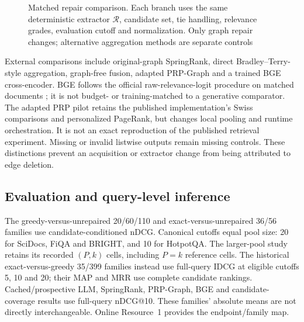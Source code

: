 \documentclass[pdflatex,iicol,sn-basic,Numbered]{sn-jnl}
\begin{document}
\begin{figure}[t]
\centering

\caption{Matched repair comparison. Each branch uses the same deterministic extractor $\mathcal R$, candidate set, tie handling, relevance grades, evaluation cutoff and normalization. Only graph repair changes; alternative aggregation methods are separate controls}
\label{fig:pipeline}
\end{figure}

External comparisons include original-graph SpringRank, direct Bradley--Terry-style aggregation, graph-free fusion, adapted PRP-Graph and a trained BGE cross-encoder. BGE follows the official raw-relevance-logit procedure on matched documents \cite{bge2024modelcard}; it is not budget- or training-matched to a generative comparator. The adapted PRP pilot retains the published implementation's Swiss comparisons and personalized PageRank, but changes local pooling and runtime orchestration. It is not an exact reproduction of the published retrieval experiment. Missing or invalid listwise outputs remain missing controls. These distinctions prevent an acquisition or extractor change from being attributed to edge deletion.

\subsection{Evaluation and query-level inference}\label{sec:statistics}
The greedy-versus-unrepaired 20/60/110 and exact-versus-unrepaired 36/56 families use candidate-conditioned nDCG. Canonical cutoffs equal pool size: 20 for SciDocs, FiQA and BRIGHT, and 10 for HotpotQA. The larger-pool study retains its recorded $(P,k)$ cells, including $P=k$ reference cells. The historical exact-versus-greedy 35/399 families instead use full-query IDCG at eligible cutoffs 5, 10 and 20; their MAP and MRR use complete candidate rankings. Cached/prospective LLM, SpringRank, PRP-Graph, BGE and candidate-coverage results use full-query nDCG@10. These families' absolute means are not directly interchangeable. Online Resource~1 provides the endpoint/family map.
\end{document}

